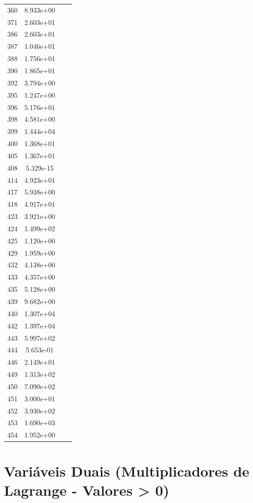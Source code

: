\documentclass[12pt]{article}
\begin{document}
\begin{longtable}{@{}cccc@{}}
360 & 8.933e+00 &  &  \\
371 & 2.603e+01 &  &  \\
386 & 2.603e+01 &  &  \\
387 & 1.046e+01 &  &  \\
388 & 1.756e+01 &  &  \\
390 & 1.865e+01 &  &  \\
392 & 3.794e+00 &  &  \\
395 & 1.247e+00 &  &  \\
396 & 5.176e+01 &  &  \\
398 & 4.581e+00 &  &  \\
399 & 1.444e+04 &  &  \\
400 & 1.368e+01 &  &  \\
405 & 1.367e+01 &  &  \\
408 & 5.329e-15 &  &  \\
414 & 4.923e+01 &  &  \\
417 & 5.938e+00 &  &  \\
418 & 4.917e+01 &  &  \\
423 & 3.921e+00 &  &  \\
424 & 1.499e+02 &  &  \\
425 & 1.120e+00 &  &  \\
429 & 1.959e+00 &  &  \\
432 & 4.138e+00 &  &  \\
433 & 4.357e+00 &  &  \\
435 & 5.128e+00 &  &  \\
439 & 9.682e+00 &  &  \\
440 & 1.307e+04 &  &  \\
442 & 1.397e+04 &  &  \\
443 & 5.997e+02 &  &  \\
444 & 5.653e-01 &  &  \\
446 & 2.149e+01 &  &  \\
449 & 1.313e+02 &  &  \\
450 & 7.090e+02 &  &  \\
451 & 3.000e+01 &  &  \\
452 & 3.930e+02 &  &  \\
453 & 1.690e+03 &  &  \\
454 & 1.952e+00 &  &  \\

\bottomrule
\end{longtable}


\section{Variáveis Duais (Multiplicadores de Lagrange - Valores > 0)}
\end{document}
